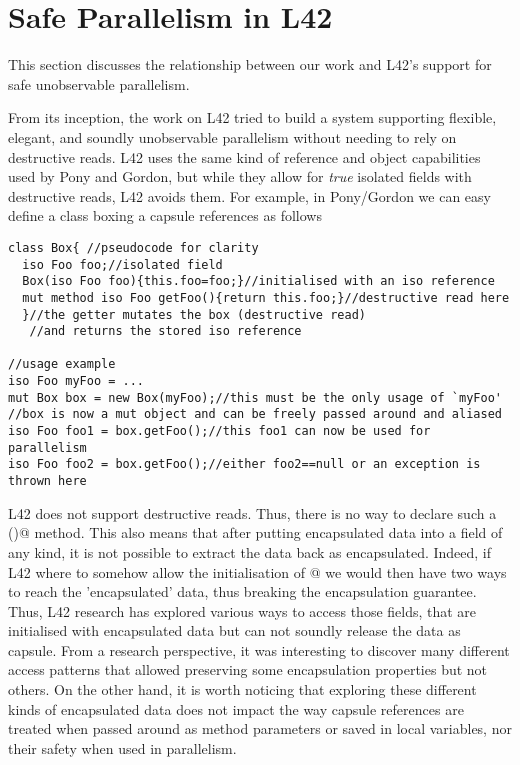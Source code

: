 \section{Safe Parallelism in L42}
\label{s:parallelism}

This section discusses the relationship between our work and L42's support for safe unobservable parallelism.

From its inception, the work on L42 tried to build a system supporting flexible, elegant, and soundly unobservable parallelism without needing to rely on destructive reads.
L42 uses  the same kind of reference and object capabilities used by Pony and Gordon, but while they allow for \emph{true} isolated fields with destructive reads, L42 avoids them.
For example, in Pony/Gordon we can easy define a class boxing a capsule references as follows
\begin{lstlisting}[morekeywords={iso}]
class Box{ //pseudocode for clarity
  iso Foo foo;//isolated field
  Box(iso Foo foo){this.foo=foo;}//initialised with an iso reference
  mut method iso Foo getFoo(){return this.foo;}//destructive read here
  }//the getter mutates the box (destructive read)
   //and returns the stored iso reference

//usage example
iso Foo myFoo = ...
mut Box box = new Box(myFoo);//this must be the only usage of `myFoo'
//box is now a mut object and can be freely passed around and aliased
iso Foo foo1 = box.getFoo();//this foo1 can now be used for parallelism
iso Foo foo2 = box.getFoo();//either foo2==null or an exception is thrown here
\end{lstlisting}
L42 does not support destructive reads. Thus, there is no way to declare such a \Q@getFoo()@ method.
This also means that after putting encapsulated data into a field of any kind, it is not possible to extract the data back as encapsulated.
Indeed, if L42 where to somehow allow the initialisation of @ we would then have two ways to reach the 'encapsulated' data, thus breaking the encapsulation guarantee.
Thus, L42 research has explored various ways to access those fields, that are initialised with encapsulated data but can not soundly release the data as capsule.
From a research perspective, it was interesting to discover many different access patterns that allowed preserving some encapsulation properties but not others.
On the other hand, it is worth noticing that exploring these different kinds of encapsulated data does not impact the way capsule references are treated when passed around as method parameters or saved in local variables, nor their safety when used in parallelism.

